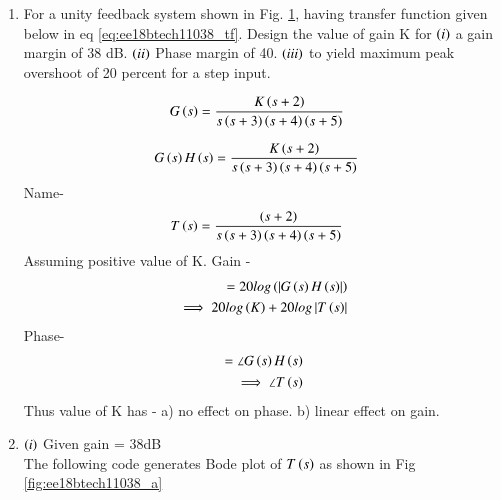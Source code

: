 \begin{enumerate}[label=\thesubsection.\arabic*.,ref=\thesubsection.\theenumi]

\item
For a unity feedback system shown in  Fig.  \ref{fig:ee18btech11038_flow}, having transfer function given below in eq \ref{eq:ee18btech11038_tf}.  Design the value of gain K for $\left(i\right)$ a gain margin of 38 dB. $\left(ii\right)$ Phase margin of 40\degree. $\left(iii\right)$ to yield maximum peak overshoot of 20 percent for a step input.

\begin{figure}[!ht]
	\begin{center}
		
		\resizebox{\columnwidth}{!}{}
	\end{center}
\caption{}
\label{fig:ee18btech11038_flow}
\end{figure}

\begin{align}
\label{eq:ee18btech11038_tf}
G\left(s\right) &= \frac{K\left(s+2\right)}{s\left(s+3\right)\left(s+4\right)\left(s+5\right)}
\end{align}
\solution 

\begin{align}
\label{eq:ee18btech11038_TF(s)}
G\left(s\right)H\left(s\right) &=\frac{K\left(s+2\right)}{s\left(s+3\right)\left(s+4\right)\left(s+5\right)}
\end{align}
Name-
\begin{align}
\label{eq:ee18btech11038_T(s)}
T\left(s\right) &= \frac{\left(s+2\right)}{s\left(s+3\right)\left(s+4\right)\left(s+5\right)}
\end{align}
Assuming positive value of K. Gain -
\begin{align}
\label{eq:ee18btech11038_gain}
      = 20log\left(\left\vert G\left(s\right)H\left(s\right)\right\vert\right)
    \\ \implies 20log\left(K\right) +20log\left\vert T\left(s\right)\right\vert
\end{align}
Phase-
\begin{align}
\label{eq:ee18btech11038_phase}
      = \angle{G\ensuremath{\left(s\right)}H\ensuremath{\left(s\right)}}
    \\ \implies \angle{T\ensuremath{\left(s\right)}}
\end{align}
 Thus value of K has - a) no effect on phase. b) linear effect on gain.




\item $\left(i\right)$ Given gain = 38dB
\\
\solution The following code generates Bode plot of $T\left(s\right)$ as shown in Fig \ref{fig:ee18btech11038_a}


\end{enumerate}
